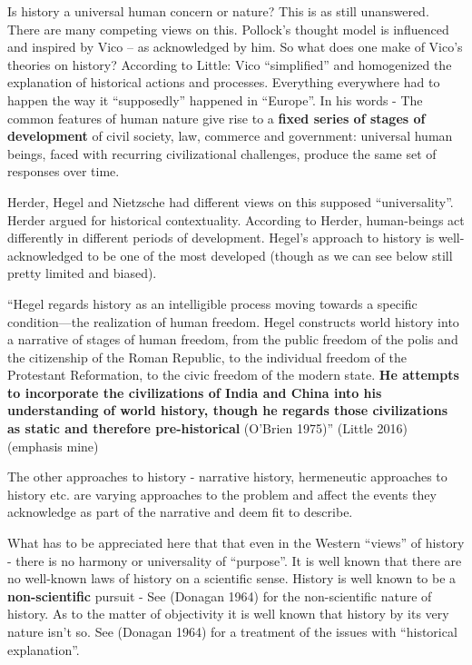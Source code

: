 Is history a universal human concern or nature? This is as still unanswered. There are many competing views on this. Pollock’s thought model is influenced and inspired by Vico – as acknowledged by him. So what does one make of Vico’s theories on history? According to Little: Vico “simplified” and homogenized the explanation of historical actions and processes. Everything everywhere had to happen the way it “supposedly” happened in “Europe”. In his words - The common features of human nature give rise to a \textbf{fixed series of stages of development} of civil society, law, commerce and government: universal human beings, faced with recurring civilizational challenges, produce the same set of responses over time.

Herder, Hegel and Nietzsche had different views on this supposed “universality”. Herder argued for historical contextuality. According to Herder, human-beings act differently in different periods of development. Hegel's approach to history is well-acknowledged to be one of the most developed (though as we can see below still pretty limited and biased).

\begin{myquote}
“Hegel regards history as an intelligible process moving towards a specific condition—the realization of human freedom. Hegel constructs world history into a narrative of stages of human freedom, from the public freedom of the polis and the citizenship of the Roman Republic, to the individual freedom of the Protestant Reformation, to the civic freedom of the modern state. \textbf{He attempts to incorporate the civilizations of India and China into his understanding of world history, though he regards those civilizations as static and therefore pre-historical} \hfill (O'Brien 1975)” (Little 2016) (emphasis mine)
\end{myquote}

The other approaches to history - narrative history, hermeneutic approaches to history etc. are varying approaches to the problem and affect the events they acknowledge as part of the narrative and deem fit to describe.

What has to be appreciated here that that even in the Western “views” of history - there is no harmony or universality of “purpose”. It is well known that there are no well-known laws of history on a scientific sense. History is well known to be a \textbf{non-scientific} pursuit - See (Donagan 1964) for the non-scientific nature of history. As to the matter of objectivity it is well known that history by its very nature isn’t so. See (Donagan 1964) for a treatment of the issues with “historical explanation”.

